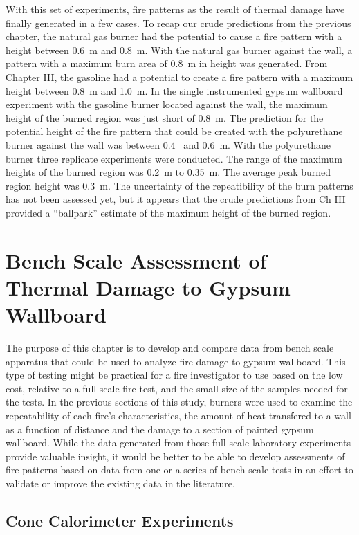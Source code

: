\documentclass[twoside]{uocthesis}
\begin{document}
With this set of experiments, fire patterns as the result of thermal damage have finally generated in a few cases.  To recap our crude predictions from the previous chapter, the natural gas burner had the potential to cause a fire pattern with a height between 0.6~m and 0.8~m.  With the natural gas burner against the wall, a pattern with a maximum burn area of 0.8~m in height was generated.  From Chapter III, the gasoline had a potential to create a fire pattern with a maximum height between 0.8~m and 1.0~m.  In the single instrumented gypsum wallboard experiment with the gasoline burner located against the wall, the maximum height of the burned region was just short of 0.8~m.  The prediction for the potential height of the fire pattern that could be created with the polyurethane burner against the wall was between 0.4~ and 0.6~m.  With the polyurethane burner three replicate experiments were conducted.  The range of the maximum heights of the burned region was 0.2~m to 0.35~m.  The average peak burned region height was 0.3~m. The uncertainty of the repeatibility of the burn patterns has not been assessed yet, but it appears that the crude predictions from Ch III provided a ``ballpark'' estimate of the maximum height of the burned region.      





\chapter{Bench Scale Assessment of Thermal Damage to Gypsum Wallboard}

The purpose of this chapter is to develop and compare data from bench scale apparatus that could be used to analyze fire damage to gypsum wallboard.
This type of testing might be practical for a fire investigator to use based on the low cost, relative to a full-scale fire test, and the small size of the samples needed for the tests.  In the previous sections of this study, burners were used to examine the repeatability of each fire's characteristics, the amount of heat transfered to a wall as a function of distance and the damage to a section of painted gypsum wallboard.  While the data generated from those full scale laboratory experiments provide valuable insight, it would be better to be able to develop assessments of fire patterns based on data from one or a series of bench scale tests in an effort to validate or improve the existing data in the literature.       


\section{Cone Calorimeter Experiments}
\end{document}
